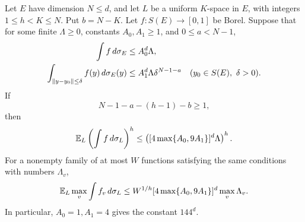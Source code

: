 \begin{lemma}\label{s:cap-moment}
Let \(E\) have dimension \(N\le d\), and let \(L\) be a uniform
\(K\)-space in \(E\), with integers \(1\le h<K\le N\). Put
\(b=N-K\). Let \(f:S(E)\to[0,1]\) be Borel. Suppose that for some
finite \(\Lambda\ge0\), constants \(A_0,A_1\ge1\), and
\(0\le a<N-1\),
\begin{align}
 \int f\,d\sigma_E&\le A_0^d\Lambda,\label{s:cap-total}\\
 \int_{\left\lVert y-y_0\right\rVert\le\delta}f(y)\,d\sigma_E(y)
 &\le A_1^d\Lambda\delta^{N-1-a}
 \quad(y_0\in S(E),\ \delta>0).\label{s:cap-hypothesis}
\end{align}
If
\begin{equation}\label{s:moment-margin}
 N-1-a-(h-1)-b\ge1,
\end{equation}
then
\begin{equation}\label{s:moment-bound}
 \mathbb E_L\left(\int f\,d\sigma_L\right)^h
 \le\left([4\max\{A_0,9A_1\}]^d\Lambda\right)^h.
\end{equation}
For a nonempty family of at most \(W\) functions satisfying the same
conditions with numbers \(\Lambda_v\),
\begin{equation}\label{s:moment-maximum}
 \mathbb E_L\max_v\int f_v\,d\sigma_L
 \le W^{1/h}[4\max\{A_0,9A_1\}]^d\max_v\Lambda_v.
\end{equation}
In particular, \(A_0=1,A_1=4\) gives the constant \(144^d\).
\end{lemma}
